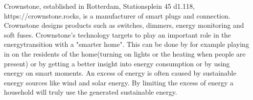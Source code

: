 Crownstone, established in Rotterdam, Stationsplein 45 d1.118, https://crownstone.rocks, is a manufacturer of smart plugs and connection. Crownstone designs products such as switches, dimmers, energy monitoring and soft fuses. Crownstone's technology targets to play an important role in the energytransition with a "smarter home". This can be done by for example playing in on the residents of the home(turning on lights or the heating when people are present) or by getting a better insight into energy consumption or by using energy on smart moments. An excess of energy is often caused by sustainable energy sources like wind and solar energy. By limiting the excess of energy a household will truly use the generated sustainable energy.